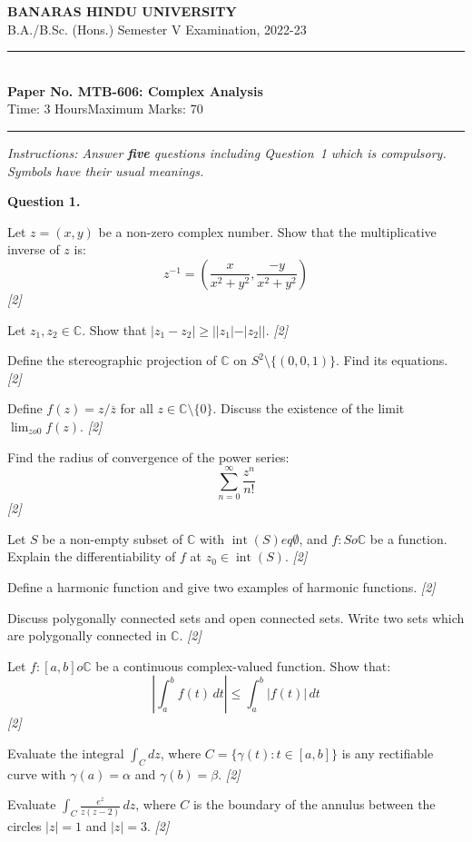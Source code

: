 \documentclass[11pt,a4paper]{article}
\newcommand{\pts}[1]{\hfill   \textit{[#1]}}
\begin{document}
\begin{center}
  {\large\bfseries BANARAS HINDU UNIVERSITY}\\[2pt]
  {\normalsize B.A./B.Sc. (Hons.) Semester V Examination, 2022-23}\\[6pt]
  \rule{0.8\linewidth}{0.5pt}\\[6pt]
  {\large\bfseries Paper No. MTB-606: Complex Analysis}\\[4pt]
  {\normalsize Time: 3 Hours\hfill Maximum Marks: 70}
\end{center}

\rule{\linewidth}{0.4pt}

\smallskip



\noindent   \textit{Instructions: Answer   \textbf{five} questions including Question~1 which is compulsory. Symbols have their usual meanings.}

\medskip


\noindent   \textbf{Question 1.}

\begin{parts}
  \item Let $z = (x,y)$ be a non-zero complex number. Show that the multiplicative inverse of $z$ is:
  \[ z^{-1} = \left( \frac{x}{x^2 + y^2}, \frac{-y}{x^2 + y^2} \right) \] \pts{2}
  \item Let $z_1, z_2 \in \mathbb{C}$. Show that $|z_1 - z_2| \ge ||z_1| - |z_2||$. \pts{2}
  \item Define the stereographic projection of $\mathbb{C}$ on $S^2 \setminus \{(0,0,1)\}$. Find its equations. \pts{2}
  \item Define $f(z) = z/\overline{z}$ for all $z \in \mathbb{C} \setminus \{0\}$. Discuss the existence of the limit $\lim_{z  o 0} f(z)$. \pts{2}
  \item Find the radius of convergence of the power series:
  \[ \sum_{n=0}^{\infty} \frac{z^n}{n!} \] \pts{2}
  \item Let $S$ be a non-empty subset of $\mathbb{C}$ with $\operatorname{int}(S) 
eq \emptyset$, and $f : S  o \mathbb{C}$ be a function. Explain the differentiability of $f$ at $z_0 \in \operatorname{int}(S)$. \pts{2}
  \item Define a harmonic function and give two examples of harmonic functions. \pts{2}
  \item Discuss polygonally connected sets and open connected sets. Write two sets which are polygonally connected in $\mathbb{C}$. \pts{2}
  \item Let $f : [a,b]  o \mathbb{C}$ be a continuous complex-valued function. Show that:
  \[ \left| \int_{a}^{b} f(t) \,dt \right| \le \int_{a}^{b} |f(t)| \,dt \] \pts{2}
  \item Evaluate the integral $\int_{C} dz$, where $C = \{\gamma(t) : t \in [a,b]\}$ is any rectifiable curve with $\gamma(a) = \alpha$ and $\gamma(b) = \beta$. \pts{2}
  \item Evaluate $\int_{C} \frac{e^z}{z(z-2)} \,dz$, where $C$ is the boundary of the annulus between the circles $|z| = 1$ and $|z| = 3$. \pts{2}
\end{parts}
\end{document}
